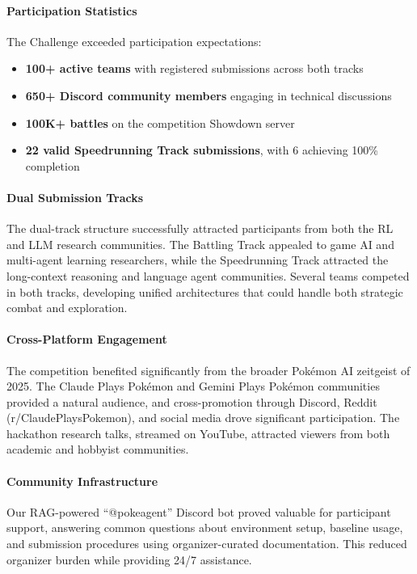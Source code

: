 \paragraph{Participation Statistics}
The \pokeagent Challenge exceeded participation expectations:
\begin{itemize}
    \item \textbf{100+ active teams} with registered submissions across both tracks
    \item \textbf{650+ Discord community members} engaging in technical discussions
    \item \textbf{100K+ battles} on the competition Showdown server
    \item \textbf{22 valid Speedrunning Track submissions}, with 6 achieving 100\% completion
\end{itemize}

\paragraph{Dual Submission Tracks}
The dual-track structure successfully attracted participants from both the RL and LLM research communities. The Battling Track appealed to game AI and multi-agent learning researchers, while the Speedrunning Track attracted the long-context reasoning and language agent communities. Several teams competed in both tracks, developing unified architectures that could handle both strategic combat and exploration.

\paragraph{Cross-Platform Engagement}
The competition benefited significantly from the broader Pokémon AI zeitgeist of 2025. The Claude Plays Pokémon and Gemini Plays Pokémon communities provided a natural audience, and cross-promotion through Discord, Reddit (r/ClaudePlaysPokemon), and social media drove significant participation. The hackathon research talks, streamed on YouTube, attracted viewers from both academic and hobbyist communities.

\paragraph{Community Infrastructure}
Our RAG-powered ``@pokeagent'' Discord bot proved valuable for participant support, answering common questions about environment setup, baseline usage, and submission procedures using organizer-curated documentation. This reduced organizer burden while providing 24/7 assistance.


